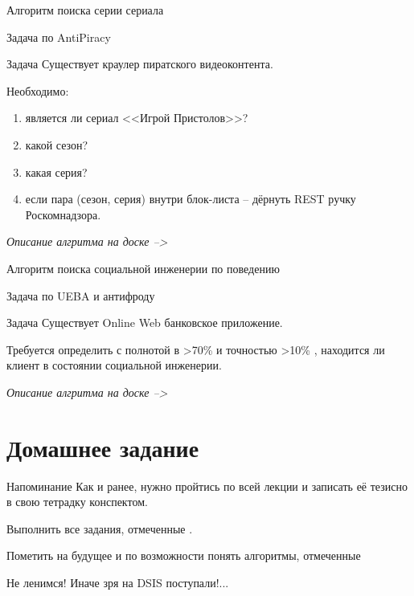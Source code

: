 \begin{frame}{Алгоритм поиска серии сериала}
	
	Задача по AntiPiracy
	
	\begin{block}{Задача}
		Существует краулер пиратского видеоконтента.
		
		Необходимо:
		\begin{enumerate}
			\item является ли сериал <<Игрой Пристолов>>?
			\item какой сезон?
			\item какая серия?
			\item если пара (сезон, серия) внутри блок-листа -- дёрнуть REST ручку Роскомнадзора.
		\end{enumerate}
	\end{block}
	
	\textit{Описание алгритма на доске --> }
	
	
\end{frame}


\begin{frame}{Алгоритм поиска социальной инженерии по поведению}
	
	Задача по UEBA и антифроду
	
	\begin{block}{Задача}
		Существует Online Web банковское приложение.
		
		Требуется определить с полнотой в >70\% и точностью >10\% , находится ли клиент в состоянии социальной инженерии.
	
	\end{block}
	
	\textit{Описание алгритма на доске --> }
	
	
\end{frame}


\section{Домашнее задание}

\begin{frame}
	\begin{block}{Напоминание}
		Как и ранее, нужно пройтись по всей лекции и записать её тезисно в свою тетрадку конспектом.
		
		Выполнить все задания, отмеченные .
		
		Пометить на будущее и по возможности понять алгоритмы, отмеченные 
		
		Не ленимся! Иначе зря на DSIS поступали!...
	\end{block}
\end{frame}


